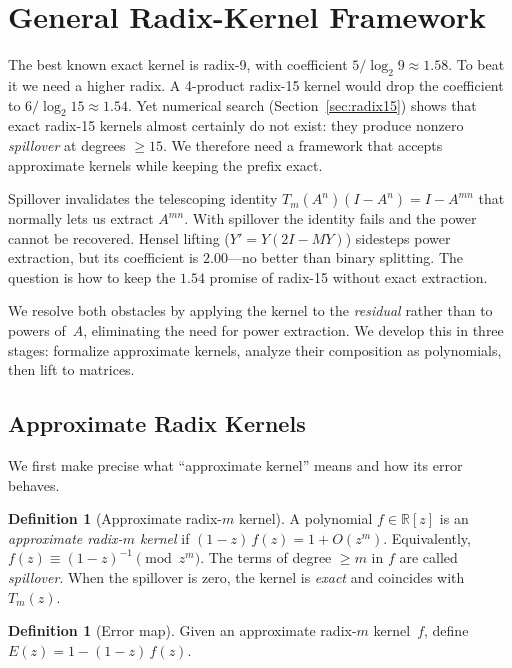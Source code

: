 \documentclass[
  journal=largetwo,
  manuscript=article,
  manuscriptlabel={Research Preprint},
  logo=false,
  simfonts=false,
  year=2026,
  volume=1,
]{cup-journal}
\theoremstyle{definition}
\newtheorem{definition}[theorem]{Definition}
\theoremstyle{remark}
\begin{document}

\section{General Radix-Kernel Framework}
\label{sec:generalradix}

The best known exact kernel is radix-9, with coefficient
$5/\log_2 9 \approx 1.58$.
To beat it we need a higher radix.
A 4-product radix-15 kernel would drop the coefficient to
$6/\log_2 15 \approx 1.54$.
Yet numerical search (Section~\ref{sec:radix15}) shows that exact
radix-15 kernels almost certainly do not exist: they produce nonzero
\emph{spillover} at degrees $\geq 15$.
We therefore need a framework that accepts approximate kernels while
keeping the prefix exact.

Spillover invalidates the telescoping identity
$T_m(A^n)(I - A^n) = I - A^{mn}$
that normally lets us extract $A^{mn}$.
With spillover the identity fails and the power cannot be recovered.
Hensel lifting ($Y' = Y(2I - MY)$) sidesteps power extraction, but
its coefficient is $2.00$---no better than binary splitting.
The question is how to keep the $1.54$ promise of radix-15 without
exact extraction.

We resolve both obstacles by applying the kernel to the \emph{residual}
rather than to powers of~$A$, eliminating the need for power extraction.
We develop this in three stages: formalize approximate kernels, analyze
their composition as polynomials, then lift to matrices.

\subsection{Approximate Radix Kernels}

We first make precise what ``approximate kernel'' means and how its
error behaves.

\begin{definition}[Approximate radix-$m$ kernel]
  \label{def:approxkernel}
  A polynomial $f \in \mathbb{R}[z]$ is an \emph{approximate radix-$m$
  kernel} if $(1-z)\,f(z) = 1 + O(z^m)$.
  Equivalently, $f(z) \equiv (1-z)^{-1} \pmod{z^m}$.
  The terms of degree $\geq m$ in $f$ are called \emph{spillover}.
  When the spillover is zero, the kernel is \emph{exact} and
  coincides with $T_m(z)$.
\end{definition}

\begin{definition}[Error map]
  \label{def:errormap}
  Given an approximate radix-$m$ kernel~$f$, define
  $E(z) = 1 - (1 - z)\,f(z)$.
\end{definition}
\end{document}
